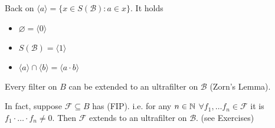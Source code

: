 Back on $\langle a\rangle = \{x\in S(\mathcal{B}): a\in x\}$. It holds
\begin{itemize}
    \item $\varnothing = \langle 0\rangle $
    \item $S(\mathcal{B}) = \langle 1\rangle $
    \item $\langle a\rangle \cap \langle b\rangle  = \langle a\cdot b\rangle $
\end{itemize}
Every filter on $B$ can be extended to an ultrafilter on $\mathcal{B}$ (Zorn's Lemma).

In fact, suppose $\mathcal{F}\subseteq B$ has (FIP). i.e. for any $n\in\mathbb{N}$ $\forall f_1,\dots f_n\in \mathcal{F}$ it is $f_1\cdot \dots \cdot f_n \neq 0$. Then $\mathcal{F}$ extends to an ultrafilter on $\mathcal{B}$.
(see Exercises)

